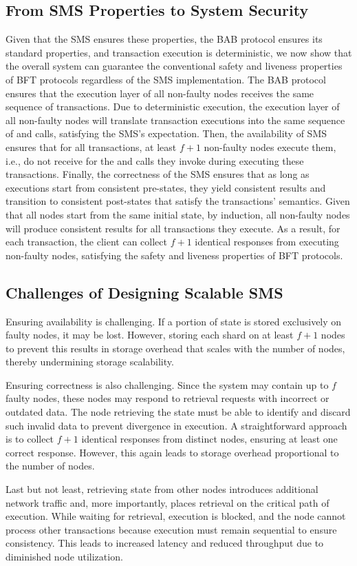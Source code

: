 \subsection{From SMS Properties to System Security}

Given that the SMS ensures these properties, the BAB protocol ensures its standard properties, and transaction execution is deterministic, we now show that the overall system can guarantee the conventional safety and liveness properties of BFT protocols regardless of the SMS implementation.
The BAB protocol ensures that the execution layer of all non-faulty nodes receives the same sequence of transactions.
Due to deterministic execution, the execution layer of all non-faulty nodes will translate transaction executions into the same sequence of \fetch and \bump calls, satisfying the SMS's expectation.
Then, the availability of SMS ensures that for all transactions, at least $f+1$ non-faulty nodes execute them, i.e., do not receive \forward for the \fetch and \bump calls they invoke during executing these transactions.
Finally, the correctness of the SMS ensures that as long as executions start from consistent pre-states, they yield consistent results and transition to consistent post-states that satisfy the transactions' semantics.
Given that all nodes start from the same initial state, by induction, all non-faulty nodes will produce consistent results for all transactions they execute.
As a result, for each transaction, the client can collect $f+1$ identical responses from executing non-faulty nodes, satisfying the safety and liveness properties of BFT protocols.

\subsection{Challenges of Designing Scalable SMS}

Ensuring availability is challenging.
If a portion of state is stored exclusively on faulty nodes, it may be lost.
However, storing each shard on at least $f+1$ nodes to prevent this results in storage overhead that scales with the number of nodes, thereby undermining storage scalability.

Ensuring correctness is also challenging.
Since the system may contain up to $f$ faulty nodes, these nodes may respond to retrieval requests with incorrect or outdated data.
The node retrieving the state must be able to identify and discard such invalid data to prevent divergence in execution.
A straightforward approach is to collect $f+1$ identical responses from distinct nodes, ensuring at least one correct response.
However, this again leads to storage overhead proportional to the number of nodes.

Last but not least, retrieving state from other nodes introduces additional network traffic and, more importantly, places retrieval on the critical path of execution.
While waiting for retrieval, execution is blocked, and the node cannot process other transactions because execution must remain sequential to ensure consistency.
This leads to increased latency and reduced throughput due to diminished node utilization.
\fi
